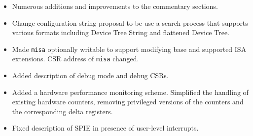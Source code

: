 \begin{itemize}
  \parskip 0pt
  \itemsep 1pt
\item Numerous additions and improvements to the commentary sections.
\item Change configuration string proposal to be use a search process
  that supports various formats including Device Tree String and
  flattened Device Tree.
\item Made {\tt misa} optionally writable to support modifying base
  and supported ISA extensions.  CSR address of {\tt misa} changed.
\item Added description of debug mode and debug CSRs.
\item Added a hardware performance monitoring scheme.  Simplified the
  handling of existing hardware counters, removing privileged versions
  of the counters and the corresponding delta registers.
\item Fixed description of SPIE in presence of user-level interrupts.
\end{itemize}
